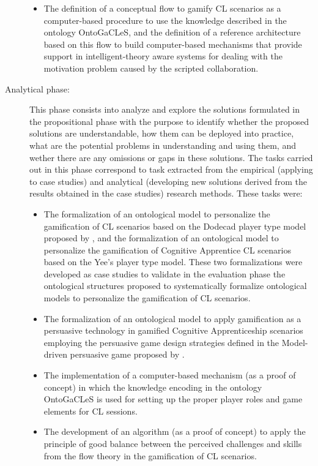 \begin{description}
\begin{itemize}
\item
The definition of a conceptual flow to gamify CL scenarios as a computer-based procedure to use the knowledge described in the ontology OntoGaCLeS, and the definition of a reference architecture based on this flow to build computer-based mechanisms that provide support in intelligent-theory aware systems for dealing with the motivation problem caused by the scripted collaboration.
\end{itemize}

\item[Analytical phase:]
This phase consists into analyze and explore the solutions formulated in the propositional phase with the purpose to identify whether the proposed solutions are understandable, how them can be deployed into practice, what are the potential problems in understanding and using them, and wether there are any omissions or gaps in these solutions. The tasks carried out in this phase correspond to task extracted from the empirical (applying to case studies) and analytical (developing new solutions derived from the results obtained in the case studies) research methods. These tasks were:

\begin{itemize}
\item
The formalization of an ontological model to personalize the gamification of CL scenarios based on the Dodecad player type model proposed by , and the formalization of an ontological model to personalize the gamification of Cognitive Apprentice CL scenarios based on the Yee's player type model. These two formalizations were developed as case studies to validate in the evaluation phase the ontological structures proposed to systematically formalize ontological models to personalize the gamification of CL scenarios.

\item
The formalization of an ontological model to apply gamification as a persuasive technology in gamified Cognitive Apprenticeship scenarios employing the persuasive game design strategies defined in the Model-driven persuasive game proposed by .

\item
The implementation of a computer-based mechanism (as a proof of concept) in which the knowledge encoding in the ontology OntoGaCLeS is used for setting up the proper player roles and game elements for CL sessions.

\item
The development of an algorithm (as a proof of concept) to apply the principle of good balance between the perceived challenges and skills from the flow theory in the gamification of CL scenarios.


\end{itemize}
\end{description}

